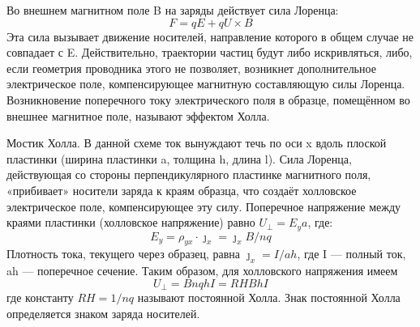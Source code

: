\documentclass[a4paper, 12pt]{article}%
\begin{document}
	Во внешнем магнитном поле B на заряды действует сила Лоренца:
	$$F = qE + qU \times B $$
	Эта сила вызывает движение носителей, направление которого в общем
	случае не совпадает с E. Действительно, траектории частиц будут либо искривляться, либо, если геометрия проводника этого не позволяет, возникнет дополнительное электрическое поле, компенсирующее магнитную составляющую силы Лоренца. Возникновение поперечного току электрического поля в образце, помещённом во внешнее магнитное поле, называют эффектом Холла.
	
	Мостик Холла. В данной схеме ток вынуждают течь по оси x вдоль плоской пластинки (ширина пластинки a, толщина h, длина l). Сила Лоренца, действующая со стороны перпендикулярного пластинке магнитного поля, «прибивает» носители заряда к краям образца, что создаёт холловское электрическое поле, компенсирующее эту
	силу. Поперечное напряжение между краями пластинки (холловское напряжение) равно $U_\perp = E_ya $, где:
	$$ E_y = \rho_{yx} \cdot \jmath_x = \jmath_x B/nq $$
	Плотность тока, текущего через образец, равна $\jmath_x = I/ah$, где I — полный ток, ah — поперечное сечение. Таким образом, для холловского напряжения имеем
	$$U_\perp = B nqh I = RH Bh I $$
	где константу $RH = 1/nq$
	называют постоянной Холла. Знак постоянной Холла определяется
	знаком заряда носителей.\\
	
\end{document}
